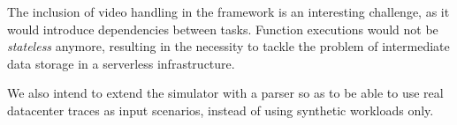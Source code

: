 The inclusion of video handling in the framework is an interesting challenge, as it would introduce dependencies between tasks. Function executions would not be \textit{stateless} anymore, resulting in the necessity to tackle the problem of intermediate data storage in a serverless infrastructure.%


We also intend to extend the simulator with a parser so as to be able to use real datacenter traces as input scenarios, instead of using synthetic workloads only. %

